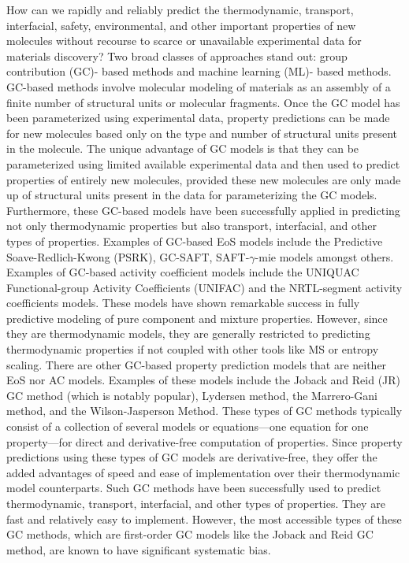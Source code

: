 \documentclass[journal=jacsat,manuscript=article]{achemso}
\begin{document}
How can we rapidly and reliably predict the thermodynamic, transport, interfacial, safety, environmental, and other important properties of new molecules without recourse to scarce or unavailable experimental data for materials discovery? Two broad classes of approaches stand out: group contribution (GC)- based methods and machine learning (ML)- based methods. 
GC-based methods involve molecular modeling of materials as an assembly of a finite number of structural units or molecular fragments. 
Once the GC model has been parameterized using experimental data, property predictions can be made for new molecules based only on the type and number of structural units present in the molecule. 
The unique advantage of GC models is that they can be parameterized using limited available experimental data and then used to predict properties of entirely new molecules, provided these new molecules are only made up of structural units present in the data for parameterizing the GC models. 
Furthermore, these GC-based models have been successfully applied in predicting not only thermodynamic properties but also transport, interfacial, and other types of properties. Examples of GC-based EoS models include the Predictive Soave-Redlich-Kwong (PSRK),  GC-SAFT, SAFT-$\gamma$-mie models amongst others. Examples of GC-based activity coefficient models include the UNIQUAC Functional-group Activity Coefficients (UNIFAC) and the NRTL-segment activity coefficients models. 
These models have shown remarkable success in fully predictive modeling of pure component and mixture properties. However, since they are thermodynamic models, they are generally restricted to predicting thermodynamic properties if not coupled with other tools like MS or entropy scaling.
There are other GC-based property prediction models that are neither EoS nor AC models. Examples of these models include the Joback and Reid (JR) GC method (which is notably popular), Lydersen method, the Marrero-Gani method, and the Wilson-Jasperson Method. These types of GC methods typically consist of a collection of several models or equations—one equation for one property—for direct and derivative-free computation of properties. Since property predictions using these types of GC models are derivative-free, they offer the added advantages of speed and ease of implementation over their thermodynamic model counterparts.
Such GC methods have been successfully used to predict thermodynamic, transport, interfacial, and other types of properties. They are fast and relatively easy to implement. 
However, the most accessible types of these GC methods, which are first-order GC models like the Joback and Reid GC method, are known to have significant systematic bias. 
\end{document}
